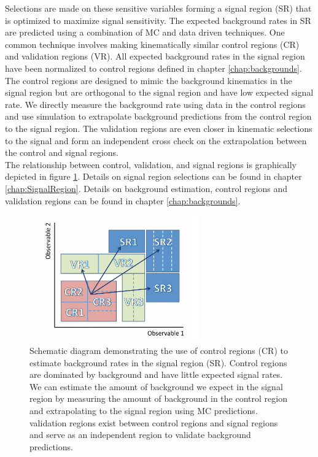 \indent Selections are made on these sensitive variables forming a signal region (SR) that is optimized to maximize signal sensitivity.  The expected background rates in SR are predicted using a combination of MC and data driven techniques.  One common technique involves making kinematically similar control regions (CR) and validation regions (VR). All expected background rates in the signal region have been normalized to control regions defined in chapter \ref{chap:backgrounds}.  The control regions are designed to mimic the background kinematics in the signal region but are orthogonal to the signal region and have low expected signal rate.  We directly measure the background rate using data in the control regions and use simulation to extrapolate background predictions from the control region to the signal region. The validation regions are even closer in kinematic selections to the signal and form an independent cross check on the extrapolation between the control and signal regions. \\

\indent The relationship between control, validation, and signal regions is graphically depicted in figure \ref{fig:CR_VR_SR_stat1}.  Details on signal region selections can be found in chapter \ref{chap:SignalRegion}.  Details on background estimation, control regions and validation regions can be found in chapter \ref{chap:backgrounds}. \\

\begin{figure}[h!]
  \centering
	\includegraphics[width=0.65\textwidth]{./figures/statistics/CR_VR_SR.pdf}
\caption[Schematic diagram demonstrating the use of control regions to estimate background rates in the signal region]{Schematic diagram demonstrating the use of control regions (CR) to estimate background rates in the signal region (SR).  Control regions are dominated by background and have little expected signal rates.  We can estimate the amount of background we expect in the signal region by measuring the amount of background in the control region and extrapolating to the signal region using MC predictions. validation regions exist between control regions and signal regions and serve as an independent region to validate background predictions.  }
\label{fig:CR_VR_SR_stat1}
\end{figure}

